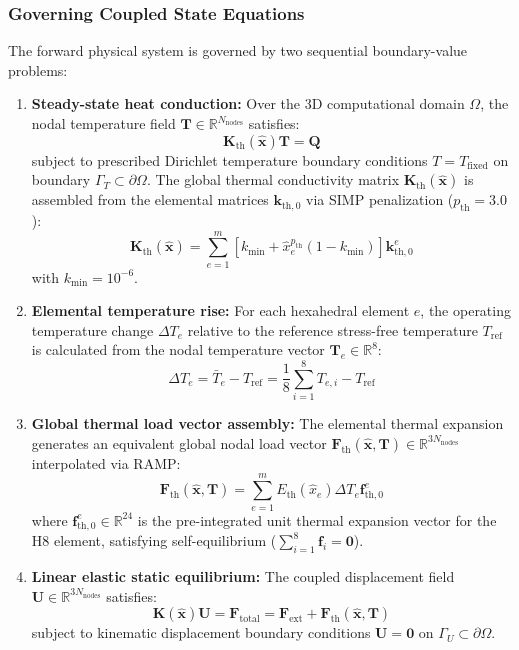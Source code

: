 \documentclass[11pt, a4paper]{article}
\begin{document}
\subsubsection{Governing Coupled State Equations}
The forward physical system is governed by two sequential boundary-value problems:
\begin{enumerate}
    \item \textbf{Steady-state heat conduction:} Over the 3D computational domain $\Omega$, the nodal temperature field $\mathbf{T} \in \mathbb{R}^{N_{\text{nodes}}}$ satisfies:
    \begin{equation}
    \mathbf{K}_{\text{th}}(\hat{\mathbf{x}}) \mathbf{T} = \mathbf{Q}
    \end{equation}
    subject to prescribed Dirichlet temperature boundary conditions $T = T_{\text{fixed}}$ on boundary $\Gamma_T \subset \partial\Omega$. The global thermal conductivity matrix $\mathbf{K}_{\text{th}}(\hat{\mathbf{x}})$ is assembled from the elemental matrices $\mathbf{k}_{\text{th}, 0}$ via SIMP penalization ($p_{\text{th}} = 3.0$):
    \begin{equation}
    \mathbf{K}_{\text{th}}(\hat{\mathbf{x}}) = \sum_{e=1}^m \left[ k_{\min} + \hat{x}_e^{p_{\text{th}}} (1 - k_{\min}) \right] \mathbf{k}_{\text{th}, 0}^e
    \end{equation}
    with $k_{\min} = 10^{-6}$.
    \item \textbf{Elemental temperature rise:} For each hexahedral element $e$, the operating temperature change $\Delta T_e$ relative to the reference stress-free temperature $T_{\text{ref}}$ is calculated from the nodal temperature vector $\mathbf{T}_e \in \mathbb{R}^8$:
    \begin{equation}
    \Delta T_e = \bar{T}_e - T_{\text{ref}} = \frac{1}{8} \sum_{i=1}^8 T_{e, i} - T_{\text{ref}}
    \end{equation}
    \item \textbf{Global thermal load vector assembly:} The elemental thermal expansion generates an equivalent global nodal load vector $\mathbf{F}_{\text{th}}(\hat{\mathbf{x}}, \mathbf{T}) \in \mathbb{R}^{3 N_{\text{nodes}}}$ interpolated via RAMP:
    \begin{equation}
    \mathbf{F}_{\text{th}}(\hat{\mathbf{x}}, \mathbf{T}) = \sum_{e=1}^m E_{\text{th}}(\hat{x}_e) \Delta T_e \mathbf{f}_{\text{th}, 0}^e
    \end{equation}
    where $\mathbf{f}_{\text{th}, 0}^e \in \mathbb{R}^{24}$ is the pre-integrated unit thermal expansion vector for the H8 element, satisfying self-equilibrium ($\sum_{i=1}^8 \mathbf{f}_i = \mathbf{0}$).
    \item \textbf{Linear elastic static equilibrium:} The coupled displacement field $\mathbf{U} \in \mathbb{R}^{3 N_{\text{nodes}}}$ satisfies:
    \begin{equation}
    \mathbf{K}(\hat{\mathbf{x}}) \mathbf{U} = \mathbf{F}_{\text{total}} = \mathbf{F}_{\text{ext}} + \mathbf{F}_{\text{th}}(\hat{\mathbf{x}}, \mathbf{T})
    \end{equation}
    subject to kinematic displacement boundary conditions $\mathbf{U} = \mathbf{0}$ on $\Gamma_U \subset \partial\Omega$.
\end{enumerate}
\end{document}
